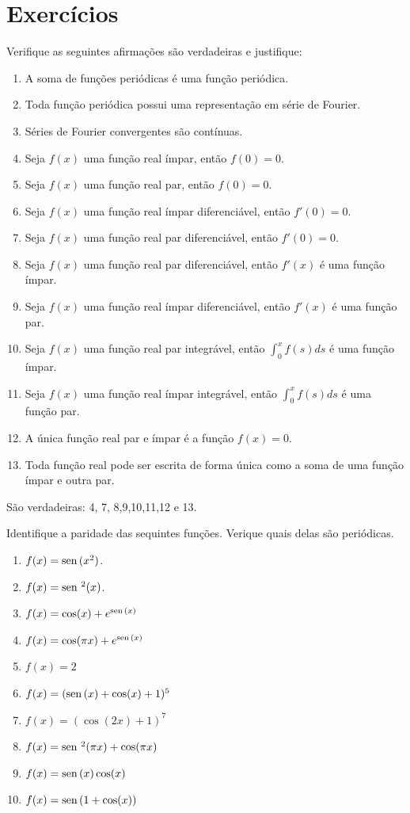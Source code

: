 \section{Exercícios}
 \begin{Exercise}Verifique as seguintes afirmações são verdadeiras e justifique:
\begin{enumerate} 
\item A soma de funções periódicas é uma função periódica.
\item Toda função periódica possui uma representação em série de Fourier.
\item Séries de Fourier convergentes são contínuas.
\item Seja $f(x)$ uma função real ímpar, então $f(0)=0$.
\item Seja $f(x)$ uma função real par, então $f(0)=0$.
\item Seja $f(x)$ uma função real ímpar diferenciável, então $f'(0)=0$.
\item Seja $f(x)$ uma função real par diferenciável, então $f'(0)=0$.
\item Seja $f(x)$ uma função real par diferenciável, então $f'(x)$ é uma função ímpar.
\item Seja $f(x)$ uma função real ímpar diferenciável, então $f'(x)$ é uma função par.
\item Seja $f(x)$ uma função real par integrável, então $\int_0^xf(s)ds$ é uma função ímpar.
\item Seja $f(x)$ uma função real ímpar integrável, então $\int_0^xf(s)ds$ é uma função par.
\item A única função real par e ímpar é a função $f(x)=0$.
\item Toda função real pode ser escrita de forma única como a soma de uma função ímpar e outra par.
\end{enumerate}
\end{Exercise}
\begin{Answer} São verdadeiras: 4, 7, 8,9,10,11,12 e 13. 
\end{Answer}
\begin{Exercise}Identifique a paridade das sequintes funções. Verique quais delas são periódicas. 
\begin{enumerate} 
\item $f(x)=\operatorname{sen}\,(x^2)$.
\item $f(x)=\operatorname{sen}\,^2(x)$.
\item $f(x)=\cos(x)+e^{\operatorname{sen}\,(x)}$
\item $f(x)=\cos(\pi x)+e^{\operatorname{sen}\,(x)}$
\item $f(x)=2$
\item $f(x)=(\operatorname{sen}\,(x)+\cos(x)+1)^5$
\item $f(x)=(\cos(2x)+1)^7$
\item $f(x)=\operatorname{sen}\,^2(\pi x)+\cos(\pi x)$
\item $f(x)=\operatorname{sen}\,(x)\cos(x)$
\item $f(x)=\operatorname{sen}\,(1+\cos(x))$
\end{enumerate}
\end{Exercise}
